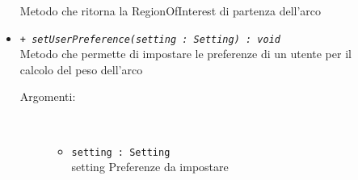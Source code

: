 \documentclass[../DefinizioneDiProdotto.tex]{subfiles}
\begin{document}
\begin{description}
\begin{itemize}
		Metodo che ritorna la RegionOfInterest di partenza dell'arco
		\item \texttt{+ \textit{setUserPreference(setting : Setting) : void}}\\
		Metodo che permette di impostare le preferenze di un utente per il calcolo del peso dell'arco
		\begin{description}
			\item[Argomenti:] \
			\begin{itemize}
				\item \texttt{setting : Setting}\\
				setting Preferenze da impostare\end{itemize}
		\end{description}
	\end{itemize}
\end{description}
\end{document}
